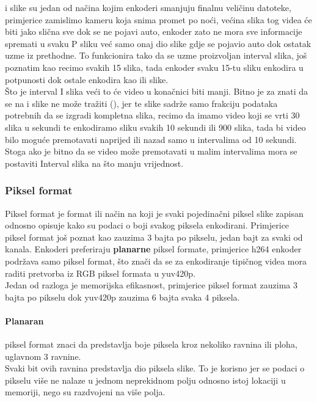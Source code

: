  i  slike su jedan od načina kojim enkoderi smanjuju finalnu veličinu datoteke, 
primjerice zamislimo kameru koja snima promet po noći,
većina slika tog videa će biti jako slična sve dok se ne pojavi auto, enkoder zato ne mora sve informacije spremati u svaku P sliku
već samo onaj dio slike gdje se pojavio auto dok ostatak uzme iz prethodne.
\paraBreak
To funkcionira tako da se uzme proizvoljan interval  slika, još poznatim kao  recimo 
svakih 15 slika, tada enkoder svaku 15-tu sliku enkodira u potpunosti dok ostale enkodira kao  ili  slike.
\\
Što je interval I slika veći to će video u konačnici biti manji.
\paraBreak
Bitno je za znati da se na  i  slike ne može tražiti (), jer te slike sadrže samo frakciju podataka potrebnih
da se izgradi kompletna slika, recimo da imamo video koji se vrti 30 slika u sekundi te enkodiramo  sliku 
svakih 10 sekundi ili 900 slika, tada bi video bilo moguće premotavati naprijed ili nazad samo u intervalima od 10 sekundi.
\paraBreak
Stoga ako je bitno da se video može premotavati u malim intervalima mora se postaviti Interval  
slika na što manju vrijednost.

\subsubsection{Piksel format} \label{sec:pixelformat}
Piksel format je format ili način na koji je svaki pojedinačni piksel slike zapisan odnosno opisuje kako su podaci o boji
svakog piksela enkodirani. Primjerice piksel format  još poznat kao  
zauzima 3 bajta po pikselu, jedan bajt za svaki od kanala.
\paraBreak
Enkoderi preferiraju \textbf{planarne} piksel formate, primjerice h264 enkoder podržava samo  piksel format, što
znači da se za enkodiranje tipičnog videa mora raditi pretvorba iz RGB piksel formata u yuv420p. \\
Jedan od razloga je memorijska efikasnost, primjerice  piksel format zauzima 3 bajta po pikselu dok
yuv420p zauzima 6 bajta svaka 4 piksela. \cite{ffmpegBook}

\paragraph{Planaran} \label{sec:planar} piksel format znaci da predstavlja boje piksela kroz nekoliko ravnina ili 
ploha, uglavnom 3 ravnine. \\
Svaki bit ovih ravnina predstavlja dio piksela slike. To je korisno jer se podaci o pikselu više ne nalaze u jednom 
neprekidnom polju odnosno istoj lokaciji u memoriji, nego su razdvojeni na više polja.

